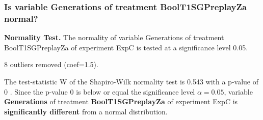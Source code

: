\begin{frame}[t]
 \frametitle{Is variable Generations of treatment BoolT1SGPreplayZa normal?}
 {\bf Normality Test.} The normality of variable Generations of treatment BoolT1SGPreplayZa of experiment ExpC is tested at a significance level 0.05.

 8 outliers removed (coef=1.5).
 
 The test-statistic W of the Shapiro-Wilk normality test is 0.543 with a p-value of 0 .
 Since the p-value 0 is below or equal the significance level $\alpha= 0.05 $,
 variable {\bf  Generations } of treatment {\bf  BoolT1SGPreplayZa } of experiment ExpC  is {\bf significantly different} from a normal distribution.

 \end{frame}
